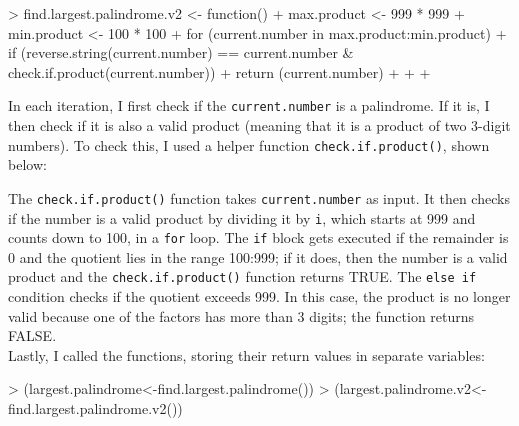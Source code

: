 \documentclass{article}
\begin{document}
\begin{enumerate}
\begin{Schunk}
\begin{Sinput}
> find.largest.palindrome.v2 <- function() {
+   max.product <- 999 * 999
+   min.product <- 100 * 100
+   for (current.number in max.product:min.product) {
+     if (reverse.string(current.number) == current.number & check.if.product(current.number)) {
+       return (current.number)
+     }
+   }
+ }
\end{Sinput}
\end{Schunk}
In each iteration, I first check if the \texttt{current.number} is a palindrome. If it is, I then check if it is also a valid product (meaning that it is a product of two 3-digit numbers). To check this, I used a helper function \texttt{check.if.product()}, shown below:\\
\begin{Schunk}
\end{Schunk}
The \texttt{check.if.product()} function takes \texttt{current.number} as input. It then checks if the number is a valid product by dividing it by \texttt{i}, which starts at 999 and counts down to 100, in a \texttt{for} loop. The \texttt{if} block gets executed if the remainder is 0 and the quotient lies in the range 100:999; if it does, then the number is a valid product and the \texttt{check.if.product()} function returns TRUE. The \texttt{else if} condition checks if the quotient exceeds 999. In this case, the product is no longer valid because one of the factors has more than 3 digits; the function returns FALSE.   \\
Lastly, I called the functions, storing their return values in separate variables:
\begin{Schunk}
\begin{Sinput}
> (largest.palindrome<-find.largest.palindrome())
> (largest.palindrome.v2<-find.largest.palindrome.v2())
\end{Sinput}
\end{Schunk}
\newpage

\end{enumerate}
\end{document}
